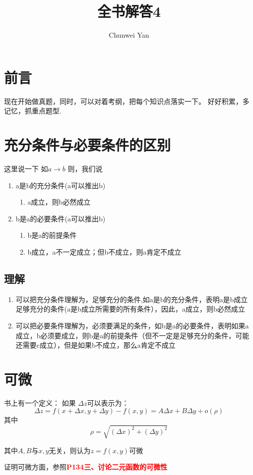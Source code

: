 \documentclass[a4paper]{ctexart}
\author{Chunwei Yan}
\title{全书解答4}
\begin{document}
    \maketitle
\begin{multicols}{2}
\section{前言}
\par
现在开始做真题，同时，可以对着考纲，把每个知识点落实一下。 好好积累，多记忆，抓重点题型.
\section{充分条件与必要条件的区别}
这里说一下
如$a \rightarrow b$
则，我们说
\begin{enumerate}
    \item a是b的充分条件(a可以推出b) 
    \begin{enumerate}
        \item a成立，则b必然成立
    \end{enumerate}
    \item b是a的必要条件(a可以推出b)
    \begin{enumerate}
        \item b是a的前提条件
        \item b成立，a不一定成立；但b不成立，则a肯定不成立
    \end{enumerate}
\end{enumerate}
\subsection{理解}
\begin{enumerate}
    \item 可以把充分条件理解为，足够充分的条件,如a是b的充分条件，表明a是b成立足够充分的条件(a是b成立所需要的所有条件），因此，a成立，则b必然成立
    \item 可以把必要条件理解为，必须要满足的条件，如b是a的必要条件，表明如果a成立，b必须要成立，则b是a的前提条件（但不一定是足够充分的条件，可能还需要c成立），但是如果b不成立，那么a肯定不成立
\end{enumerate}


\section{可微}
\par 书上有一个定义：
如果 $\Delta z$可以表示为：
\begin{equation}
\Delta z = f(x + \Delta x, y + \Delta y) - f(x, y) = A \Delta x + B \Delta y + o(\rho)
\end{equation}
其中 
$$
\rho = \sqrt{(\Delta x)^2 + (\Delta y)^2}
$$
\par 其中$A,B$与$x,y$无关，则认为$z=f(x,y)$可微
\par
证明可微方面，参照\textbf{\textcolor{red}{P134\quad 三、讨论二元函数的可微性}}


\end{multicols}
\end{document}

